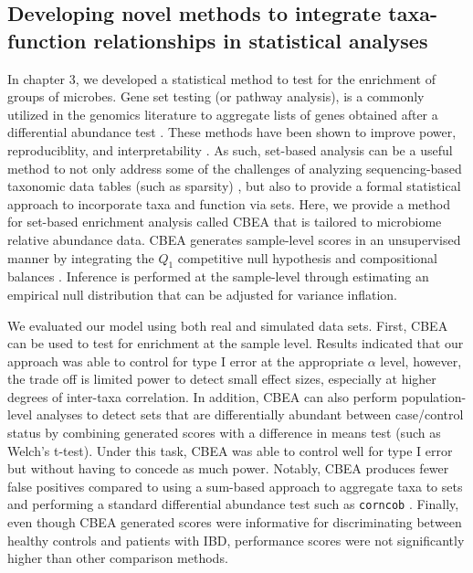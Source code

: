 \subsection{Developing novel methods to integrate taxa-function relationships in statistical analyses}

In chapter 3, we developed a statistical method to test for the enrichment of groups of microbes. Gene set testing (or pathway analysis), is a commonly utilized in the genomics literature to aggregate lists of genes obtained after a differential abundance test \cite{irizarry2009gene, goeman2007analyzing}. These methods have been shown to improve power, reproduciblity, and interpretability \cite{khatri2012ten}. As such, set-based analysis can be a useful method to not only address some of the challenges of analyzing sequencing-based taxonomic data tables (such as sparsity) \cite{li2015microbiome}, but also to provide a formal statistical approach to incorporate taxa and function via sets. Here, we provide a method for set-based enrichment analysis called CBEA that is tailored to microbiome relative abundance data. CBEA generates sample-level scores in an unsupervised manner by integrating the $Q_1$ competitive null hypothesis \cite{tian2005discovering} and compositional balances \cite{silverman2017phylogenetic, egozcue2003isometric}. Inference is performed at the sample-level through estimating an empirical null distribution that can be adjusted for variance inflation. 

We evaluated our model using both real and simulated data sets. First, CBEA can be used to test for enrichment at the sample level. Results indicated that our approach was able to control for type I error at the appropriate $\alpha$ level, however, the trade off is limited power to detect small effect sizes, especially at higher degrees of inter-taxa correlation. In addition, CBEA can also perform population-level analyses to detect sets that are differentially abundant between case/control status by combining generated scores with a difference in means test (such as Welch's t-test). Under this task, CBEA was able to control well for type I error but without having to concede as much power. Notably, CBEA produces fewer false positives compared to using a sum-based approach to aggregate taxa to sets and performing a standard differential abundance test such as \texttt{corncob} \cite{martin2020modeling}. Finally, even though CBEA generated scores were informative for discriminating between healthy controls and patients with IBD, performance scores were not significantly higher than other comparison methods.  

